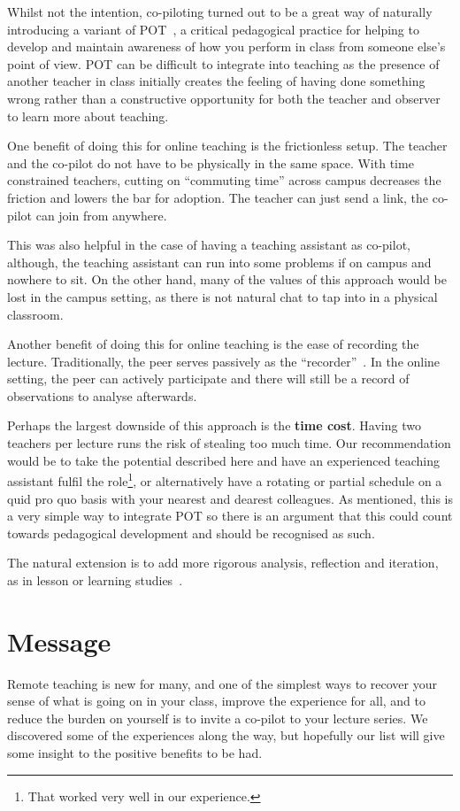 \documentclass{article}
\begin{document}
Whilst not the intention, co-piloting turned out to be a great way of naturally 
introducing a variant of 
\ac{POT}~\cite[\cf][]{PeerObservation,ReflectivePeerObservation}, a critical 
pedagogical practice for helping to develop and maintain awareness of how you 
perform in class from someone else's point of view. \Ac{POT} can be difficult 
to integrate into teaching as the presence of another teacher in class 
initially creates the feeling of having done something wrong rather than a 
constructive opportunity for both the teacher and observer to learn more about 
teaching.

One benefit of doing this for online teaching is the frictionless setup. The 
teacher and the co-pilot do not have to be physically in the same space.
With time constrained teachers, cutting on \enquote{commuting time} across 
campus decreases the friction and lowers the bar for adoption.
The teacher can just send a link, the co-pilot can join from anywhere.

This was also helpful in the case of having a teaching assistant as co-pilot, 
although, the teaching assistant can run into some problems if on campus and 
nowhere to sit.
On the other hand, many of the values of this approach would be lost in the 
campus setting, as  there is not natural chat to tap into in a physical 
classroom.

Another benefit of doing this for online teaching is the ease of recording the 
lecture.
Traditionally, the peer serves passively as the 
\enquote{recorder}~\cite{PeerObservation,ReflectivePeerObservation}.
In the online setting, the peer can actively participate and there will still 
be a record of observations to analyse afterwards.

Perhaps the largest downside of this approach is the \textbf{time cost}. Having 
two teachers per lecture runs the risk of stealing too much time. Our 
recommendation would be to take the potential described here and have an 
experienced teaching assistant fulfil the role\footnote{%
  That worked very well in our experience.
}, or alternatively have a rotating or partial schedule on a quid pro quo basis 
with your nearest and dearest colleagues. As mentioned, this is a very simple 
way to integrate \ac{POT} so there is an argument that this could count towards 
pedagogical development and should be recognised as such.

The natural extension is to add more rigorous analysis, reflection and 
iteration, as in lesson or learning 
studies~\cite{NecessaryConditionsOfLearning}.


\section*{Message}

Remote teaching is new for many, and one of the simplest ways to recover your sense of what is going on in your class, improve the experience for all, and to reduce the burden on yourself is to invite a co-pilot to your lecture series. We discovered some of the experiences along the way, but hopefully our list will give some insight to the positive benefits to be had.


\printbibliography
\end{document}

